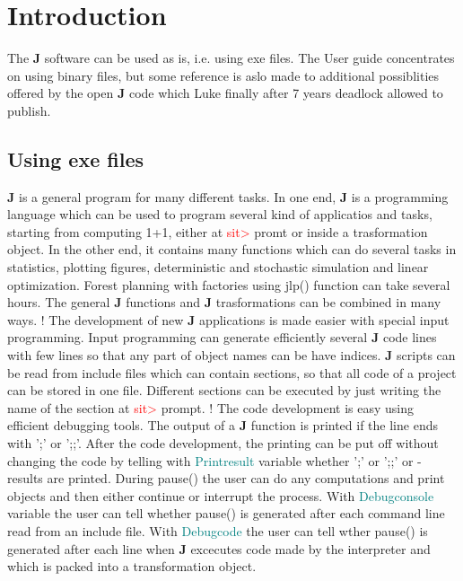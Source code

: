 \section{Introduction}
\label{intro}
The \textbf{J} software can be used as is, i.e. using exe files. The User guide concentrates
on using binary files, but some reference is aslo made to additional possiblities offered
by the open \textbf{J} code which Luke finally after 7 years deadlock allowed to publish.
\subsection{Using exe files}
\label{intro1}
\textbf{J} is a general program for many different tasks. In one end, \textbf{J} is a programming language which
can be used to program several kind of applicatios and tasks, starting from computing 1+1, either
at \textcolor{Red}{sit>} promt or inside a trasformation object.
In the other end, it contains many functions which
can do several tasks in statistics, plotting figures,
deterministic and stochastic simulation and linear optimization. Forest planning with factories
using \textcolor{VioletRed}{jlp}() function can take several hours.
The general \textbf{J} functions and \textbf{J} trasformations can be combined in many ways.
!
The development of new \textbf{J} applications is made easier with special input programming. Input
programming can generate efficiently several \textbf{J} code lines with few lines so that any part of
object names can be have indices. \textbf{J} scripts can be read from include files which can contain
sections, so that all code of a project can be stored in one file. Different sections can
be executed by just writing the name of the section at \textcolor{Red}{sit>} prompt.
!
The code development is easy using efficient debugging tools. The output of a \textbf{J} function is printed
if the line ends with ';' or ';;'. After the code development, the printing can be put off without
changing the code by telling with \textcolor{teal}{Printresult} variable whether ';' or ';;' or - results
are printed. During \textcolor{VioletRed}{pause}() the user can do any computations and print objects and
then either continue or interrupt the process. With \textcolor{teal}{Debugconsole} variable the user can
tell whether \textcolor{VioletRed}{pause}() is generated after each command line read from an include file. With
\textcolor{teal}{Debugcode} the user can tell wther \textcolor{VioletRed}{pause}() is generated after each line when \textbf{J} excecutes
code made by the interpreter and which is packed into a transformation object.

